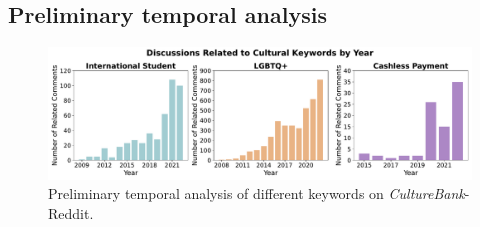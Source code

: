 \documentclass{article} %
\newcommand{\dataname}{\textit{CultureBank}\xspace}
\begin{document}
\subsection{Preliminary temporal analysis}
\label{appendix:temporal analysis}
\begin{figure}[ht]
\centering
\includegraphics[width=\textwidth]{./img/reddit_topics_temporal_analysis.pdf}
\caption{Preliminary temporal analysis of different keywords on \dataname-Reddit.}
\label{fig:reddit_topics_temporal_analysis}
\end{figure}
\end{document}
